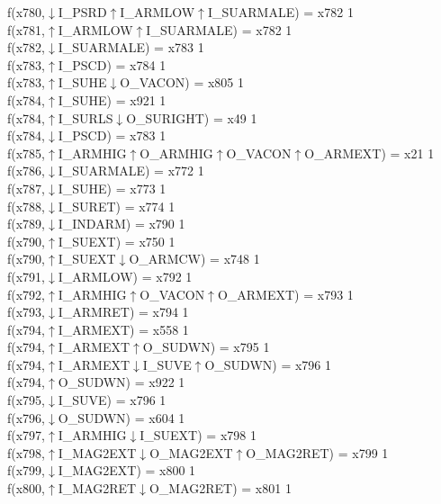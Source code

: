 f(x780,$\downarrow$I\_PSRD$\uparrow$I\_ARMLOW$\uparrow$I\_SUARMALE) = x782 {1} \\
f(x781,$\uparrow$I\_ARMLOW$\uparrow$I\_SUARMALE) = x782 {1} \\
f(x782,$\downarrow$I\_SUARMALE) = x783 {1} \\
f(x783,$\uparrow$I\_PSCD) = x784 {1} \\
f(x783,$\uparrow$I\_SUHE$\downarrow$O\_VACON) = x805 {1} \\
f(x784,$\uparrow$I\_SUHE) = x921 {1} \\
f(x784,$\uparrow$I\_SURLS$\downarrow$O\_SURIGHT) = x49 {1} \\
f(x784,$\downarrow$I\_PSCD) = x783 {1} \\
f(x785,$\uparrow$I\_ARMHIG$\uparrow$O\_ARMHIG$\uparrow$O\_VACON$\uparrow$O\_ARMEXT) = x21 {1} \\
f(x786,$\downarrow$I\_SUARMALE) = x772 {1} \\
f(x787,$\downarrow$I\_SUHE) = x773 {1} \\
f(x788,$\downarrow$I\_SURET) = x774 {1} \\
f(x789,$\downarrow$I\_INDARM) = x790 {1} \\
f(x790,$\uparrow$I\_SUEXT) = x750 {1} \\
f(x790,$\uparrow$I\_SUEXT$\downarrow$O\_ARMCW) = x748 {1} \\
f(x791,$\downarrow$I\_ARMLOW) = x792 {1} \\
f(x792,$\uparrow$I\_ARMHIG$\uparrow$O\_VACON$\uparrow$O\_ARMEXT) = x793 {1} \\
f(x793,$\downarrow$I\_ARMRET) = x794 {1} \\
f(x794,$\uparrow$I\_ARMEXT) = x558 {1} \\
f(x794,$\uparrow$I\_ARMEXT$\uparrow$O\_SUDWN) = x795 {1} \\
f(x794,$\uparrow$I\_ARMEXT$\downarrow$I\_SUVE$\uparrow$O\_SUDWN) = x796 {1} \\
f(x794,$\uparrow$O\_SUDWN) = x922 {1} \\
f(x795,$\downarrow$I\_SUVE) = x796 {1} \\
f(x796,$\downarrow$O\_SUDWN) = x604 {1} \\
f(x797,$\uparrow$I\_ARMHIG$\downarrow$I\_SUEXT) = x798 {1} \\
f(x798,$\uparrow$I\_MAG2EXT$\downarrow$O\_MAG2EXT$\uparrow$O\_MAG2RET) = x799 {1} \\
f(x799,$\downarrow$I\_MAG2EXT) = x800 {1} \\
f(x800,$\uparrow$I\_MAG2RET$\downarrow$O\_MAG2RET) = x801 {1} \\
